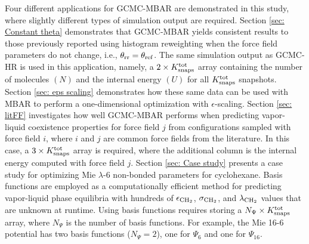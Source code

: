 \documentclass[journal=jced,manuscript=article]{achemso}
\begin{document}
Four different applications for GCMC-MBAR are demonstrated in this study, where slightly different types of simulation output are required. Section \ref{sec: Constant theta} demonstrates that GCMC-MBAR yields consistent results to those previously reported using histogram reweighting when the force field parameters do not change, i.e., $\theta_{\rm rr} = \theta_{\rm ref}$. The same simulation output as GCMC-HR is used in this application, namely, a $2 \times K^{\rm tot}_{\rm snaps}$ array containing the number of molecules $(N)$ and the internal energy $(U)$ for all $K^{\rm tot}_{\rm snaps}$ snapshots. Section \ref{sec: eps scaling} demonstrates how these same data can be used with MBAR to perform a one-dimensional optimization with $\epsilon$-scaling. Section \ref{sec: litFF} investigates how well GCMC-MBAR performs when predicting vapor-liquid coexistence properties for force field $j$ from configurations sampled with force field $i$, where $i$ and $j$ are common force fields from the literature. In this case, a $3 \times K^{\rm tot}_{\rm snaps}$ array is required, where the additional column is the internal energy computed with force field $j$. Section \ref{sec: Case study} presents a case study for optimizing Mie $\lambda$-6 non-bonded parameters for cyclohexane. Basis functions are employed as a computationally efficient method for predicting vapor-liquid phase equilibria with hundreds of $\epsilon_{\rm CH_2}$, $\sigma_{\rm CH_2}$, and $\lambda_{\rm CH_2}$ values that are unknown at runtime. Using basis functions requires storing a $N_{\Psi} \times K^{\rm tot}_{\rm snaps}$ array, where $N_{\Psi}$ is the number of basis functions. For example, the Mie 16-6 potential has two basis functions ($N_{\Psi} = 2$), one for $\Psi_{6}$ and one for $\Psi_{16}$. 


\end{document}
